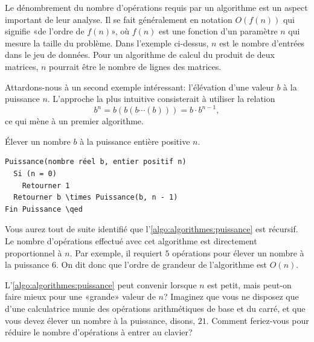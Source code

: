 Le dénombrement du nombre d'opérations requis par un algorithme est un
aspect important de leur analyse. Il se fait généralement en notation
$O(f(n))$ qui signifie «de l'ordre de $f(n)$», où $f(n)$ est une
fonction d'un paramètre $n$ qui mesure la taille du problème. Dans
l'exemple ci-dessus, $n$ est le nombre d'entrées dans le jeu de
données. Pour un algorithme de calcul du produit de deux matrices, $n$
pourrait être le nombre de lignes des matrices.

Attardons-nous à un second exemple intéressant: l'élévation d'une
valeur $b$ à la puissance $n$. L'approche la plus intuitive
consisterait à utiliser la relation
\begin{equation*}
  b^n = b (b (b \cdots (b))) = b \cdot b^{n - 1},
\end{equation*}
ce qui mène à un premier algorithme.

\begin{algorithme}
  \label{algo:algorithmes:puissance}
  Élever un nombre $b$ à la puissance entière positive $n$.
  \begin{pseudocode}
\begin{Verbatim}[commandchars=\\\{\}]
Puissance(nombre réel b, entier positif n)
  Si (n = 0)
    Retourner 1
  Retourner b \times Puissance(b, n - 1)
Fin Puissance \qed
\end{Verbatim}
  \end{pseudocode}
\end{algorithme}

Vous aurez tout de suite identifié que
l'\autoref{algo:algorithmes:puissance} est récursif. Le nombre
d'opérations effectué avec cet algorithme est directement
proportionnel à $n$. Par exemple, il requiert $5$ opérations pour
élever un nombre à la puissance $6$. On dit donc que l'ordre de
grandeur de l'algorithme est $O(n)$.

L'\autoref{algo:algorithmes:puissance} peut convenir lorsque $n$ est
petit, mais peut-on faire mieux pour une «grande» valeur de $n$?
Imaginez que vous ne disposez que d'une calculatrice munie des
opérations arithmétiques de base et du carré, et que vous devez élever
un nombre à la puissance, disons, $21$. Comment feriez-vous pour
réduire le nombre d'opérations à entrer au clavier?


